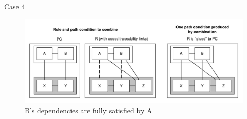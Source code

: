 \documentclass[xcolor=dvipsnames, 14pt]{beamer}
\begin{document}
\begin{frame}{Case 4}
\begin{figure}[h!] \centering \includegraphics[width=\textwidth]{../figures/building_path_conditions/total_satisfied_dependencies.pdf}
	\caption{B's dependencies are fully satisfied by A}
	\label{fig:total_satisfied_dependencies}
\end{figure}
\end{frame}
\end{document}
